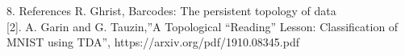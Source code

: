 \documentclass{beamer}
\begin{document}
\begin{frame}{8. References}
\noindent [1] R. Ghrist, Barcodes: The persistent topology of data \\

[2]. A. Garin and G. Tauzin,”A Topological “Reading” Lesson: Classification of
MNIST using TDA”, https://arxiv.org/pdf/1910.08345.pdf

\end{frame}
\end{document}
